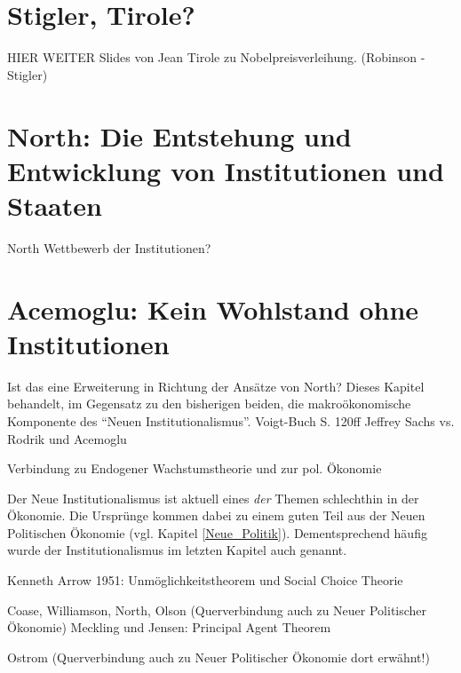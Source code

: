 \section{Stigler, Tirole?}
HIER WEITER
Slides von Jean Tirole zu Nobelpreisverleihung. (Robinson - Stigler)


\section{North: Die Entstehung und Entwicklung von Institutionen und Staaten}
North
Wettbewerb der Institutionen?



\section{Acemoglu: Kein Wohlstand ohne Institutionen}

Ist das eine Erweiterung in Richtung der Ansätze von North?
Dieses Kapitel behandelt, im Gegensatz zu den bisherigen beiden, die makroökonomische Komponente des "`Neuen Institutionalismus"'. 
Voigt-Buch S. 120ff
Jeffrey Sachs vs. Rodrik und Acemoglu



Verbindung zu Endogener Wachstumstheorie \textcite[S. 633ff]{Snowdon2005} und zur pol. Ökonomie \textcite[S. 562]{Snowdon2005}

Der Neue Institutionalismus ist aktuell eines \textit{der} Themen schlechthin in der Ökonomie. Die Ursprünge kommen dabei zu einem guten Teil aus der Neuen Politischen Ökonomie (vgl. Kapitel \ref{Neue_Politik}). Dementsprechend häufig wurde der Institutionalismus im letzten Kapitel auch genannt.





Kenneth Arrow 1951: Unmöglichkeitstheorem und Social Choice Theorie




Coase, Williamson, North, Olson (Querverbindung auch zu Neuer Politischer Ökonomie)
Meckling und Jensen: Principal Agent Theorem



Ostrom (Querverbindung auch zu Neuer Politischer Ökonomie dort erwähnt!)



